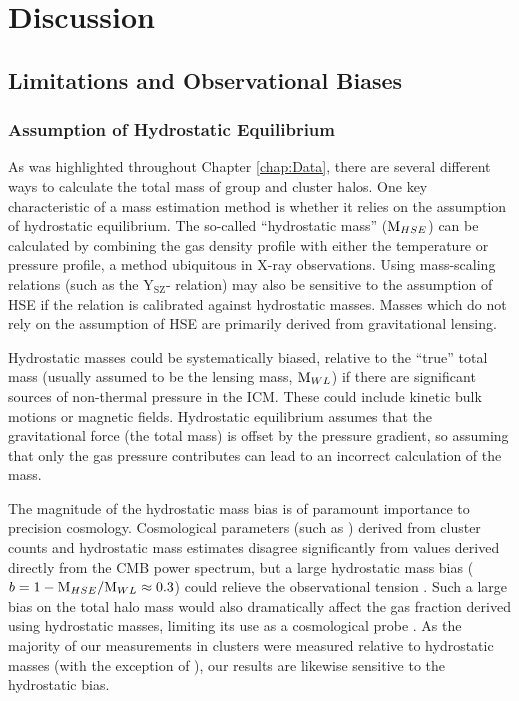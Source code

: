 \chapter{Discussion}
\label{chap:Discussion}

\section{Limitations and Observational Biases}
\label{sec:Limitations}

\subsection{Assumption of Hydrostatic Equilibrium}
\label{sec:Limitations.HSE}
As was highlighted throughout Chapter \ref{chap:Data}, there are
several different ways to calculate the total mass of group and
cluster halos. One key characteristic of a mass estimation method is
whether it relies on the assumption of hydrostatic equilibrium. The
so-called ``hydrostatic mass'' ($\textrm{M}{}_{HSE}$) can be calculated by combining the gas
density profile with either the temperature or pressure profile, a
method ubiquitous in X-ray observations. Using mass-scaling relations
(such as the Y$_\textrm{SZ}$-\Mfive{} relation) may also be sensitive
to the assumption of HSE if the relation is calibrated against
hydrostatic masses. Masses which do not rely on the assumption of HSE
are primarily derived from gravitational lensing.

Hydrostatic masses could be systematically biased, relative to the
``true'' total mass (usually assumed to be the lensing mass, $\textrm{M}{}_{WL}$) if there
are significant sources of non-thermal pressure in the ICM. These
could include kinetic bulk motions or magnetic fields. Hydrostatic
equilibrium assumes that the gravitational force (the total mass) is
offset by the pressure gradient, so assuming that only the gas
pressure contributes can lead to an incorrect calculation of the
mass. 

The magnitude of the hydrostatic mass bias is of paramount importance
to precision cosmology. Cosmological parameters (such as \omegam{})
derived from \Planck{} cluster counts and hydrostatic mass estimates
disagree significantly from values derived directly from the CMB power
spectrum, but a large hydrostatic mass bias ($ b= 1-
\textrm{M}{}_{HSE}/\textrm{M}{}_{WL} \approx 0.3$) could relieve the
observational tension \citep{Gruen2013,VonderLinden2014}. Such a large
bias on the total halo mass would also dramatically affect the gas
fraction derived using hydrostatic masses, limiting its use as a
cosmological probe . As the majority of
our \fg{} measurements in clusters were measured relative to
hydrostatic masses (with the exception of \citet{Umetsu2009}), our
results are likewise sensitive to the hydrostatic bias.

